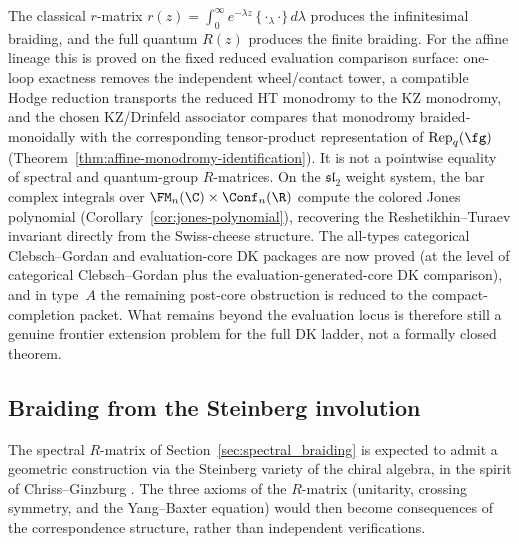 \begin{remark}
\label{rem:dk-kontsevich}
The classical $r$-matrix
$r(z) = \int_0^\infty e^{-\lambda z}\,\{{\cdot}_\lambda{\cdot}\}
\,d\lambda$ produces the infinitesimal braiding, and the full quantum
$R(z)$ produces the finite braiding. For the affine lineage this is
proved on the fixed reduced evaluation comparison surface: one-loop
exactness removes the independent wheel/contact tower, a compatible
Hodge reduction transports the reduced HT monodromy to the KZ
monodromy, and the chosen KZ/Drinfeld associator compares that
monodromy braided-monoidally with the corresponding tensor-product
representation of $\mathrm{Rep}_q(\fg)$
\textup{(}Theorem~\ref{thm:affine-monodromy-identification}\textup).
It is not a pointwise equality of spectral and quantum-group
\(R\)-matrices. On the $\mathfrak{sl}_2$ weight system, the bar complex
integrals over $\FM_n(\C) \times \Conf_n(\R)$ compute the colored Jones
polynomial (Corollary~\ref{cor:jones-polynomial}), recovering the
Reshetikhin--Turaev invariant directly from the Swiss-cheese structure.
The all-types categorical Clebsch--Gordan and
evaluation-core DK packages are now proved
(at the level of categorical Clebsch--Gordan plus the
evaluation-generated-core DK comparison), and in type~$A$ the
remaining post-core obstruction is reduced to the compact-completion
packet.
What remains beyond the evaluation locus is therefore still a genuine
frontier extension problem for the full DK ladder, not a formally
closed theorem.
\end{remark}

\subsection{Braiding from the Steinberg involution}
\label{subsec:braiding-steinberg-involution}

\providecommand{\Steinberg}{\mathfrak{S}}
\providecommand{\Mvac}{{\mathcal{M}_{\mathrm{vac}}}}
\providecommand{\Stch}{\operatorname{St}^{\mathrm{ch}}}

The spectral $R$-matrix of Section~\ref{sec:spectral_braiding}
is expected to admit a geometric construction via the Steinberg variety of the
chiral algebra, in the spirit of Chriss--Ginzburg
\cite{ChrissGinzburg}. The three axioms of the $R$-matrix (unitarity,
crossing symmetry, and the Yang--Baxter equation) would then become
consequences of the correspondence structure, rather than
independent verifications.

